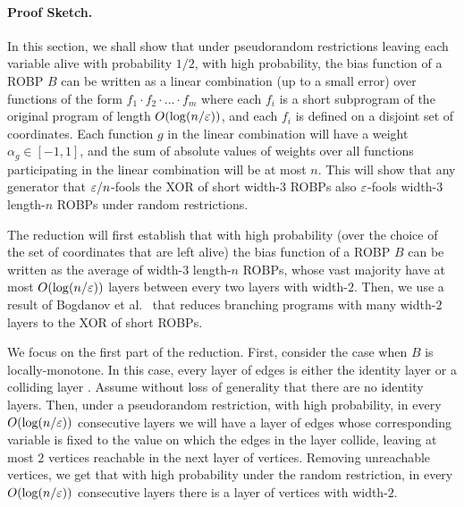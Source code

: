 \paragraph{Proof Sketch.}
In this section, we shall show that under pseudorandom restrictions leaving each variable alive with probability $1/2$, with high probability, the bias function of a ROBP $B$ can be written as a linear combination (up to a small error) over functions of the form $f_1 \cdot f_2 \cdot \ldots \cdot f_m$ where each $f_i$ is a  short subprogram of the original program of length $O(\log (n/\varepsilon))$, and each $f_i$ is defined on a disjoint set of coordinates. Each function $g$ in the linear combination will have a weight $\alpha_g \in [-1,1]$, and the sum of absolute values of weights over all functions participating in the linear combination will be at most $n$. This will show that any generator that $\varepsilon/n$-fools the XOR of short width-$3$ ROBPs also $\varepsilon$-fools width-$3$ length-$n$ ROBPs under random restrictions.

The reduction will first establish that with high probability (over the choice of the set of coordinates that are left alive) the bias function of a ROBP $B$ can be written as the average of width-$3$ length-$n$ ROBPs, whose vast majority have at most $O(\log (n/\varepsilon))$ layers between every two layers with width-$2$. 
Then, we use a result of Bogdanov et al.~\cite{BogdanovDVY13} that  reduces branching programs with many width-$2$ layers to the XOR of short ROBPs.

We focus on the first part of the reduction. 
First, consider the case when $B$ is locally-monotone. 
In this case, every layer of edges is either the identity layer or a colliding layer \cite{BrodyV10}. Assume without loss of generality that there are no identity layers.
Then, under a pseudorandom restriction, with high probability, in every $O(\log (n/\varepsilon))$ consecutive layers we will have a layer of edges whose corresponding variable is fixed to the value on which the edges in the layer collide, leaving at most $2$ vertices reachable in the next layer of vertices. Removing unreachable vertices, we get that with high probability under the random restriction, in every $O(\log (n/\varepsilon))$ consecutive layers there is a layer of vertices with width-$2$.

